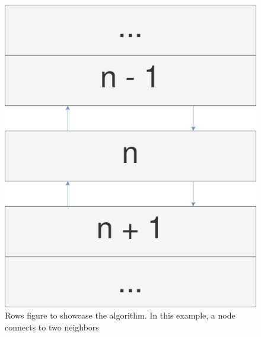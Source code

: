 \documentclass[11pt, a4paper]{article}
\begin{document}
\begin{enumerate}
\begin{figure}[H]
	\centering
	\includegraphics[width=0.4\linewidth]{imgs/columns}
	\caption[Rows Communication]{Rows figure to showcase the algorithm. In this example, a node connects to two neighbors}
	\label{fig:columns}
\end{figure}
	
\end{enumerate}
\end{document}

